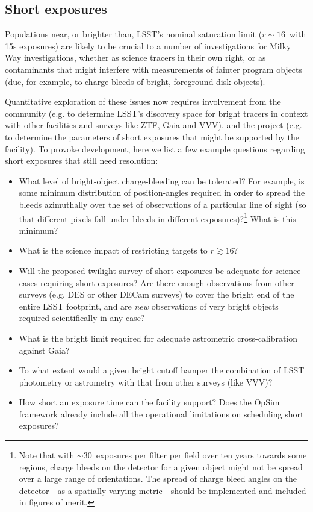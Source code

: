 \subsection{Short exposures}

  Populations near, or brighter than, LSST's nominal saturation
  limit ($r \sim 16$~with 15s exposures) are likely to be crucial to a
  number of investigations for Milky Way investigations, whether as
  science tracers in their own right, or as contaminants that might
  interfere with measurements of fainter program objects (due, for
  example, to charge bleeds of bright, foreground disk objects).

  Quantitative exploration of these issues now requires involvement from
  the community (e.g. to determine LSST's discovery space for bright
  tracers in context with other facilities and surveys like ZTF, Gaia
  and VVV), and the project (e.g. to determine the parameters of short
  exposures that might be supported by the facility). To provoke
  development, here we list a few example questions regarding short
  exposures that still need resolution:

\begin{itemize}
  \item{What level of bright-object charge-bleeding can be tolerated? For example, is some minimum distribution of position-angles required in order to spread the bleeds azimuthally over the set of observations of a particular line of sight (so that different pixels fall under bleeds in different exposures)?\footnote{Note that with $\sim 30$~exposures per filter per field over ten years towards some regions, charge bleeds on the detector for a given object might not be spread over a large range of orientations. The spread of charge bleed angles on the detector - as a spatially-varying metric - should be implemented and included in figures of merit.} What is this minimum?}
    \item{What is the science impact of restricting targets to $r \gtrsim 16$?}
      \item{Will the proposed twilight survey of short exposures be adequate for science cases requiring short exposures? Are there enough observations from other surveys (e.g. DES or other DECam surveys) to cover the bright end of the entire LSST footprint, and are {\it new} observations of very bright objects required scientifically in any case?}
        \item{What is the bright limit required for adequate astrometric cross-calibration against Gaia?}
          \item{To what extent would a given bright cutoff hamper the combination of LSST photometry or astrometry with that from other surveys (like VVV)?}
          \item{How short an exposure time can the facility support? Does the OpSim framework already include all the operational limitations on scheduling short exposures?}
\end{itemize}


